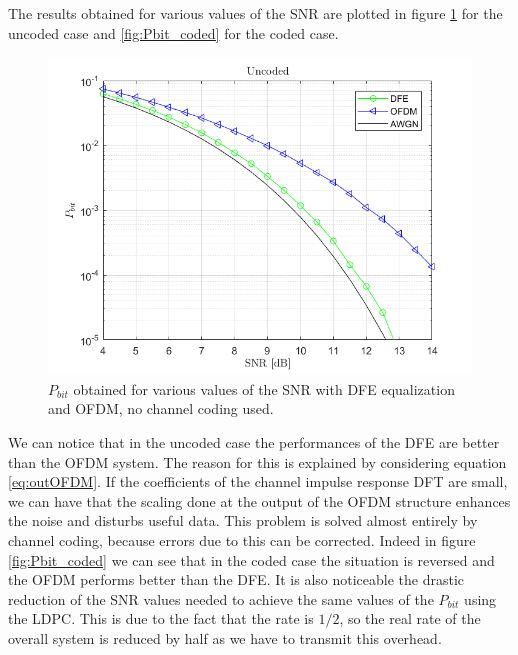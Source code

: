 \documentclass[a4paper,11.5pt]{article}
\begin{document}
The results obtained for various values of the SNR are plotted in figure \ref{fig:Pbit_uncoded} for the uncoded case and \ref{fig:Pbit_coded} for the coded case.


\begin{figure}[H]
	\begin{center}   
		\includegraphics[width=\textwidth]{figs/Pbit_uncoded_1.png} 
		\caption{$P_{bit}$ obtained for various values of the SNR with DFE equalization and OFDM, no channel coding used.}
		\label{fig:Pbit_uncoded}
	\end{center}
\end{figure}

We can notice that in the uncoded case the performances of the DFE are better than the OFDM system. The reason for this is explained by considering equation \ref{eq:outOFDM}. If the coefficients of the channel impulse response DFT are small, we can have that the scaling done at the output of the OFDM structure enhances the noise and disturbs useful data. This problem is solved almost entirely by channel coding, because errors due to this can be corrected. Indeed in figure \ref{fig:Pbit_coded} we can see that in the coded case the situation is reversed and the OFDM performs better than the DFE.
It is also noticeable the drastic reduction of the SNR values needed to achieve the same values of the $P_{bit}$ using the LDPC. This is due to the fact that the rate is $1/2$, so the real rate of the overall system is reduced by half as we have to transmit this overhead.
\end{document}
